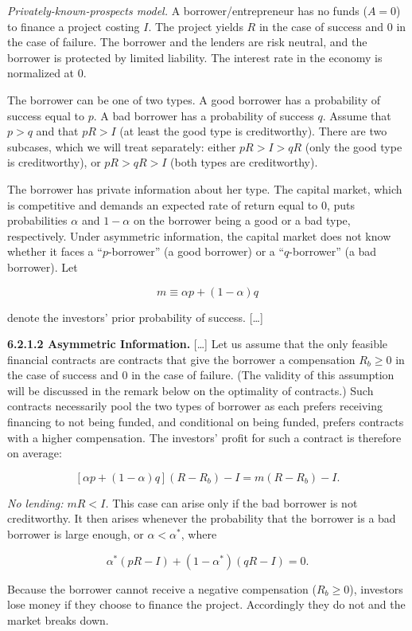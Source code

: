 \documentclass[11pt,a4paper]{article}
\begin{document}
\emph{Privately-known-prospects model.} A borrower/entrepreneur has no funds (\(A = 0\)) to finance
a project costing \(I\). The project yields \(R\) in the case of success and 0 in the case of
failure. The borrower and the lenders are risk neutral, and the borrower is protected by limited
liability. The interest rate in the economy is normalized at 0.

The borrower can be one of two types. A good borrower has a probability of success equal to \(p\). A
bad borrower has a probability of success \(q\). Assume that \(p > q\) and that \(pR > I\) (at least
the good type is creditworthy). There are two subcases, which we will treat separately: either
\(pR > I > qR\) (only the good type is creditworthy), or \(pR > qR > I\) (both types are
creditworthy).

The borrower has private information about her type. The capital market, which is competitive and
demands an expected rate of return equal to 0, puts probabilities \(\alpha\) and \(1 - \alpha\) on
the borrower being a good or a bad type, respectively. Under asymmetric information, the capital
market does not know whether it faces a ``\(p\)-borrower'' (a good borrower) or a ``\(q\)-borrower''
(a bad borrower). Let

\[m \equiv \alpha p + (1 - \alpha) q\]

denote the investors' prior probability of success. {[}\ldots{]}

\textbf{6.2.1.2 Asymmetric Information.} {[}\ldots{]} Let us assume that the only feasible financial
contracts are contracts that give the borrower a compensation \(R_b \geqslant 0\) in the case of
success and 0 in the case of failure. (The validity of this assumption will be discussed in the
remark below on the optimality of contracts.) Such contracts necessarily pool the two types of
borrower as each prefers receiving financing to not being funded, and conditional on being funded,
prefers contracts with a higher compensation. The investors' profit for such a contract is therefore
on average:

\[[\alpha p + (1 - \alpha) q](R - R_b) - I = m(R - R_b) - I.\]

\emph{No lending: \(mR < I\).} This case can arise only if the bad borrower is not creditworthy. It
then arises whenever the probability that the borrower is a bad borrower is large enough, or
\(\alpha < \alpha^*\), where

\[\alpha^*(pR - I) + (1 - \alpha^*)(qR - I) = 0.\]

Because the borrower cannot receive a negative compensation (\(R_b \geqslant 0\)), investors lose
money if they choose to finance the project. Accordingly they do not and the market breaks down.
\end{document}
